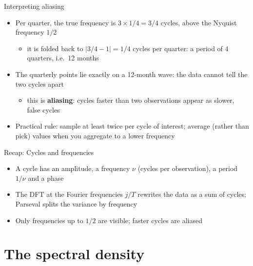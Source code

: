 \begin{frame}{Interpreting aliasing}
\itemsize{\small}
\begin{itemize}
    \item Per quarter, the true frequency is $3 \times 1/4 = 3/4$ cycles, above the Nyquist frequency $1/2$
    \begin{itemize}
        \item it is folded back to $|3/4 - 1| = 1/4$ cycles per quarter: a period of 4 quarters, i.e.\ 12 months
    \end{itemize}
    \item The quarterly points lie exactly on a 12-month wave: the data cannot tell the two cycles apart
    \begin{itemize}
        \item this is \textbf{aliasing}: cycles faster than two observations appear as slower, false cycles
    \end{itemize}
    \item Practical rule: sample at least twice per cycle of interest; average (rather than pick) values when you aggregate to a lower frequency
\end{itemize}
\end{frame}

\begin{frame}{Recap: Cycles and frequencies}
\itemsize{\small}
\begin{itemize}
    \item A cycle has an amplitude, a frequency $\nu$ (cycles per observation), a period $1/\nu$ and a phase
    \item The DFT at the Fourier frequencies $j/T$ rewrites the data as a sum of cycles; Parseval splits the variance by frequency
    \item Only frequencies up to $1/2$ are visible; faster cycles are aliased
\end{itemize}
\end{frame}


\section{The spectral density}


